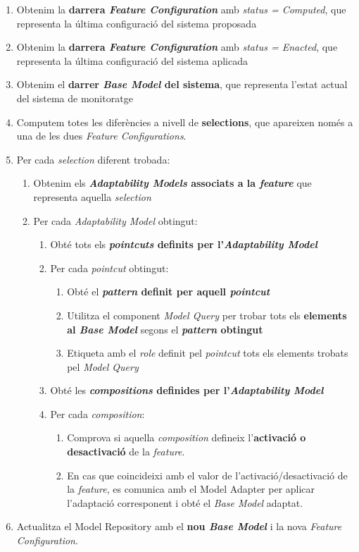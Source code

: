 \begin{enumerate}
\item Obtenim la \textbf{darrera \textit{Feature Configuration}} amb \textit{status = Computed}, que representa la última configuració del sistema proposada
\item Obtenim la \textbf{darrera \textit{Feature Configuration}} amb \textit{status = Enacted}, que representa la última configuració del sistema aplicada
\item Obtenim el \textbf{darrer \textit{Base Model} del sistema}, que representa l'estat actual del sistema de monitoratge
\item Computem totes les diferències a nivell de \textbf{selections}, que apareixen només a una de les dues \textit{Feature Configurations}.
\item Per cada \textit{selection} diferent trobada:
\begin{enumerate}
\item Obtenim els \textbf{\textit{Adaptability Models} associats a la \textit{feature}} que representa aquella \textit{selection}
\item Per cada \textit{Adaptability Model} obtingut:
\begin{enumerate}
\item Obté tots els \textbf{\textit{pointcuts} definits per l'\textit{Adaptability Model}}
\item Per cada \textit{pointcut} obtingut:
\begin{enumerate}
\item Obté el \textbf{\textit{pattern} definit per aquell \textit{pointcut}}
\item Utilitza el component \textit{Model Query} per trobar tots els \textbf{elements al \textit{Base Model}} segons el \textbf{\textit{pattern} obtingut}
\item Etiqueta amb el \textit{role} definit pel \textit{pointcut} tots els elements trobats pel \textit{Model Query}
\end{enumerate}
\item Obté les \textbf{\textit{compositions} definides per l'\textit{Adaptability Model}}
\item Per cada \textit{composition}:
\begin{enumerate}
\item Comprova si aquella \textit{composition} defineix l'\textbf{activació o desactivació} de la \textit{feature}. 
\item En cas que coincideixi amb el valor de l'activació/desactivació de la \textit{feature}, es comunica amb el Model Adapter per aplicar l'adaptació corresponent i obté el \textit{Base Model} adaptat.
\end{enumerate}
\end{enumerate}
\end{enumerate}
\item Actualitza el Model Repository amb el \textbf{nou \textit{Base Model}} i la nova \textit{Feature Configuration}.
\end{enumerate}

